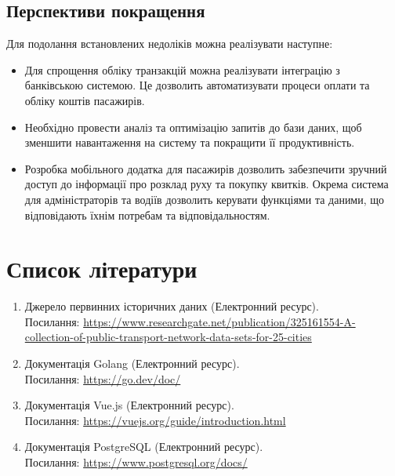 \documentclass[oneside,14pt]{extarticle}
\begin{document}
\subsection{Перспективи покращення}
Для подолання встановлених недоліків можна реалізувати наступне:
\begin{itemize}
\item Для спрощення обліку транзакцій можна реалізувати інтеграцію з банківською системою. Це дозволить автоматизувати процеси оплати та обліку коштів пасажирів.
\item Необхідно провести аналіз та оптимізацію запитів до бази даних, щоб зменшити навантаження на систему та покращити її продуктивність.
\item Розробка мобільного додатка для пасажирів дозволить забезпечити зручний доступ до інформації про розклад руху та покупку квитків. Окрема система для адміністраторів та водіїв дозволить керувати функціями та даними, що відповідають їхнім потребам та відповідальностям.
\end{itemize}

\newpage

\section*{Список літератури}
\setcounter{subsection}{0}

\begin{enumerate}
\item Джерело первинних історичних даних (Електронний ресурс). \\Посилання: \href{https://www.researchgate.net/publication/325161554_A_collection_of_public_transport_network_data_sets_for_25_cities}{https://www.researchgate.net/publication/325161554-A-collection-of-public-transport-network-data-sets-for-25-cities}
\item Документація Golang (Електронний ресурс). \\Посилання: \href{https://go.dev/doc/}{https://go.dev/doc/}
\item Документація Vue.js (Електронний ресурс). \\Посилання: \href{https://vuejs.org/guide/introduction.html}{https://vuejs.org/guide/introduction.html}
\item Документація PostgreSQL (Електронний ресурс). \\Посилання: \href{https://www.postgresql.org/docs/}{https://www.postgresql.org/docs/}
\end{enumerate}
\end{document}
